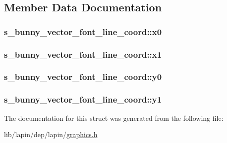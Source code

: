 \subsection{Member Data Documentation}
\hypertarget{structs__bunny__vector__font__line__coord_aecb89f13405cb07d27de8fe0a067a620}{
\subsubsection[{x0}]{ s\-\_\-bunny\-\_\-vector\-\_\-font\-\_\-line\-\_\-coord\-::x0}}\label{structs__bunny__vector__font__line__coord_aecb89f13405cb07d27de8fe0a067a620}
\hypertarget{structs__bunny__vector__font__line__coord_a3935686b372a0a2f3170140ff317d9ce}{
\subsubsection[{x1}]{ s\-\_\-bunny\-\_\-vector\-\_\-font\-\_\-line\-\_\-coord\-::x1}}\label{structs__bunny__vector__font__line__coord_a3935686b372a0a2f3170140ff317d9ce}
\hypertarget{structs__bunny__vector__font__line__coord_ac3756f7b4c4e0079bea0c065c0346c00}{
\subsubsection[{y0}]{ s\-\_\-bunny\-\_\-vector\-\_\-font\-\_\-line\-\_\-coord\-::y0}}\label{structs__bunny__vector__font__line__coord_ac3756f7b4c4e0079bea0c065c0346c00}
\hypertarget{structs__bunny__vector__font__line__coord_afd41146225993809226b256cf9b733f1}{
\subsubsection[{y1}]{ s\-\_\-bunny\-\_\-vector\-\_\-font\-\_\-line\-\_\-coord\-::y1}}\label{structs__bunny__vector__font__line__coord_afd41146225993809226b256cf9b733f1}


The documentation for this struct was generated from the following file\-:\begin{DoxyCompactItemize}
\item 
lib/lapin/dep/lapin/\hyperlink{graphics_8h}{graphics.\-h}\end{DoxyCompactItemize}
